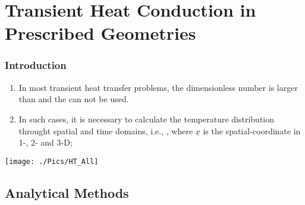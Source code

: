 \documentclass[10pt,compress,handout,ignorenonframetext,unknownkeysallowed]{beamer}
\begin{document}
\section{Transient Heat Conduction in Prescribed Geometries}

\begin{frame}
 \frametitle{Introduction}
   \begin{enumerate}%
     \item<1-> In most transient heat transfer problems, the  dimensionless number is larger than  and the  can not be used.
     \item<2-> In such cases, it is necessary to calculate the temperature distribution throught spatial and time domains, i.e., , where $\underline{x}$ is the spatial-coordinate in 1-, 2- and 3-D;
   \end{enumerate}

   \begin{center}
      \texttt{[image: ./Pics/HT\_All]}
   \end{center}
\end{frame}


\subsection{Analytical Methods}
\end{document}
